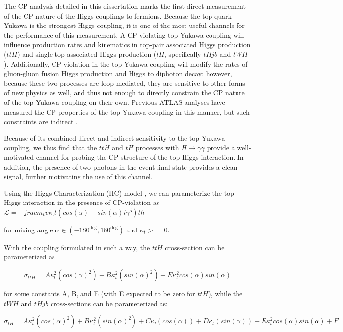 The CP-analysis detailed in this dissertation marks the first direct measurement of the CP-nature of the Higgs couplings to fermions. Because the top quark Yukawa is the strongest Higgs coupling, it is one of the most useful channels for the performance of this measurement. A CP-violating top Yukawa coupling will influence production rates and kinematics in top-pair associated Higgs production ($t \bar{t} H$) and single-top associated Higgs production ($tH$, specifically $tHjb$ and $tWH$). Additionally, CP-violation in the top Yukawa coupling will modify the rates of gluon-gluon fusion Higgs production and Higgs to diphoton decay; however, because these two processes are loop-mediated, they are sensitive to other forms of new physics as well, and thus not enough to directly constrain the CP nature of the top Yukawa coupling on their own. Previous ATLAS analyses have measured the CP properties of the top Yukawa coupling in this manner, but such constraints are indirect \cite{Aaboud_2018}.

Because of its combined direct and indirect sensitivity to the top Yukawa coupling, we thus find that the $ttH$ and $tH$ processes with $H \rightarrow \gamma \gamma $ provide a well-motivated channel for probing the CP-structure of the top-Higgs interaction. In addition, the presence of two photons in the event final state provides a clean signal, further motivating the use of this channel. 

Using the Higgs Characterization (HC) model \cite{HC}, we can parameterize the top-Higgs interaction in the presence of CP-violation as $\mathcal{L} = -frac{m_{t}}{v} \kappa_{t} \bar{t} (cos(\alpha)+ sin(\alpha) i \gamma^{5} )th$

for mixing angle $\alpha \in (-180^{\deg}, 180^{\deg})$ and $\kappa_{t} >= 0$.

With the coupling formulated in such a way, the $ttH$ cross-section can be parameterized as

\begin{equation}
\sigma_{ttH} =  A\kappa_{t}^{2} (cos(\alpha)^{2}) + B\kappa_{t}^{2} (sin(\alpha)^{2}) + E \kappa_{t}^{2} cos(\alpha)sin(\alpha)
\end{equation}

for some constants A, B, and E (with E expected to be zero for $ttH$), while the $tWH$ and $tHjb$ cross-sections can be parameterized as:

\begin{equation}
\sigma_{tH} =  A\kappa_{t}^{2} (cos(\alpha)^{2}) + B\kappa_{t}^{2} (sin(\alpha)^{2}) + C\kappa_{t} (cos(\alpha))+ D\kappa_{t} (sin(\alpha)) + E \kappa_{t}^{2} cos(\alpha)sin(\alpha) + F
\end{equation}

